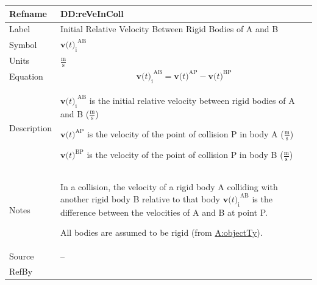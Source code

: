 \documentclass[12pt]{article}
\begin{document}
\vspace{\baselineskip}
\noindent
\begin{minipage}{\textwidth}
\begin{tabular}{>{\raggedright}p{}>{\raggedright\arraybackslash}p{}}
\toprule \textbf{Refname} & \textbf{DD:reVeInColl}
\label{DD:reVeInColl}
\\ \midrule
Label & Initial Relative Velocity Between Rigid Bodies of A and B
        
\\ \midrule
Symbol & ${{\symbf{v}\text{(}t\text{)}_{\text{i}}}^{\text{A}\text{B}}}$
         
\\ \midrule
Units & $\frac{\text{m}}{\text{s}}$
        
\\ \midrule
Equation & \begin{displaymath}
           {{\symbf{v}\text{(}t\text{)}_{\text{i}}}^{\text{A}\text{B}}}={\symbf{v}\text{(}t\text{)}^{\text{A}\text{P}}}-{\symbf{v}\text{(}t\text{)}^{\text{B}\text{P}}}
           \end{displaymath}
\\ \midrule
Description & \begin{symbDescription}
              \item{${{\symbf{v}\text{(}t\text{)}_{\text{i}}}^{\text{A}\text{B}}}$ is the initial relative velocity between rigid bodies of A and B ($\frac{\text{m}}{\text{s}}$)}
              \item{${\symbf{v}\text{(}t\text{)}^{\text{A}\text{P}}}$ is the velocity of the point of collision P in body A ($\frac{\text{m}}{\text{s}}$)}
              \item{${\symbf{v}\text{(}t\text{)}^{\text{B}\text{P}}}$ is the velocity of the point of collision P in body B ($\frac{\text{m}}{\text{s}}$)}
              \end{symbDescription}
\\ \midrule
Notes & In a collision, the velocity of a rigid body A colliding with another rigid body B relative to that body ${{\symbf{v}\text{(}t\text{)}_{\text{i}}}^{\text{A}\text{B}}}$ is the difference between the velocities of A and B at point P.
        
        All bodies are assumed to be rigid (from \hyperref[assumpOT]{A:objectTy}).
        
\\ \midrule
Source & --
         
\\ \midrule
RefBy & 
\\ \bottomrule
\end{tabular}
\end{minipage}
\end{document}
